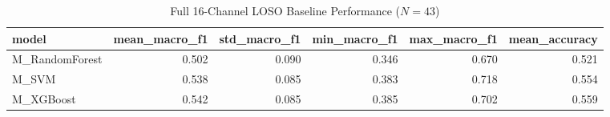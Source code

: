 \begin{table}
\caption{Full 16-Channel LOSO Baseline Performance ($N=43$)}
\label{tab:full_channel}
\begin{tabular}{lrrrrr}
\toprule
model & mean_macro_f1 & std_macro_f1 & min_macro_f1 & max_macro_f1 & mean_accuracy \\
\midrule
M_RandomForest & 0.502 & 0.090 & 0.346 & 0.670 & 0.521 \\
M_SVM & 0.538 & 0.085 & 0.383 & 0.718 & 0.554 \\
M_XGBoost & 0.542 & 0.085 & 0.385 & 0.702 & 0.559 \\
\bottomrule
\end{tabular}
\end{table}

